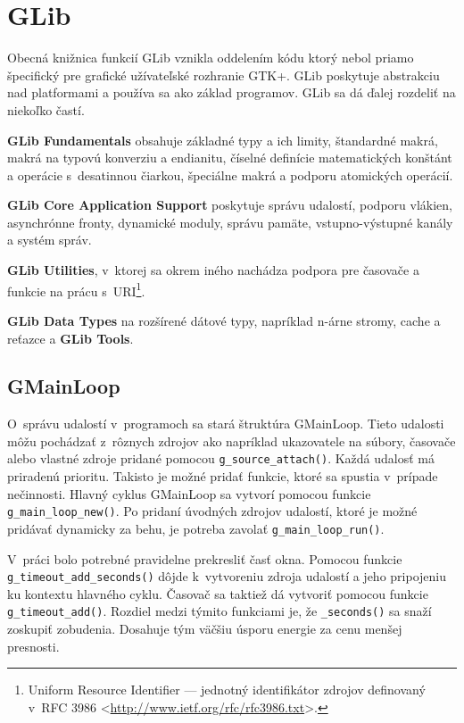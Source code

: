 \documentclass[12pt,oneside,final]{fithesis2}
\begin{document}
\section{GLib}
Obecná knižnica funkcií GLib vznikla oddelením kódu ktorý nebol priamo špecifický pre grafické užívateľské rozhranie GTK+. GLib poskytuje abstrakciu nad platformami a používa sa ako základ programov. GLib sa dá ďalej rozdeliť na niekoľko častí. 

\textbf{GLib Fundamentals} obsahuje základné typy a ich limity, štandardné makrá, makrá na typovú konverziu a endianitu, číselné definície matematických konštánt a operácie s~desatinnou čiarkou, špeciálne makrá a podporu atomických operácií.

\textbf{GLib Core Application Support} poskytuje správu udalostí, podporu vlákien, asynchrónne fronty, dynamické moduly, správu pamäte, vstupno-výstupné kanály a systém správ.
 
\textbf{GLib Utilities}, v~ktorej sa okrem iného nachádza podpora pre časovače a funkcie na prácu s~URI\footnote{Uniform Resource Identifier --- jednotný identifikátor zdrojov definovaný v~RFC 3986 <\url{http://www.ietf.org/rfc/rfc3986.txt}>.}.

\textbf{GLib Data Types} na rozšírené dátové typy, napríklad n-árne stromy, cache a reťazce a \textbf{GLib Tools}.

\subsection{GMainLoop}
O~správu udalostí v~programoch sa stará štruktúra GMainLoop. Tieto udalosti môžu pochádzať z~rôznych zdrojov ako napríklad ukazovatele na súbory, časovače alebo vlastné zdroje pridané pomocou \texttt{g\_source}\texttt{\_attach()}. Každá udalosť má priradenú prioritu. Takisto je možné pridať funkcie, ktoré sa spustia v~prípade nečinnosti. Hlavný cyklus GMainLoop sa vytvorí pomocou funkcie \texttt{g\_main\_loop\_new()}. Po pridaní úvodných zdrojov udalostí, ktoré je možné pridávať dynamicky za behu, je potreba zavolať \texttt{g\_main\_loop\_run()}.

V~práci bolo potrebné pravidelne prekresliť časť okna. Pomocou funkcie \texttt{g\_timeout\_add\_seconds()} dôjde k~vytvoreniu zdroja udalostí a jeho pripojeniu ku kontextu hlavného cyklu. Časovač sa taktiež dá vytvoriť pomocou funkcie \texttt{g\_timeout\_add()}. Rozdiel medzi týmito funkciami je, že \texttt{\_seconds()} sa snaží zoskupiť zobudenia. Dosahuje tým väčšiu úsporu energie za cenu menšej presnosti.
\end{document}
